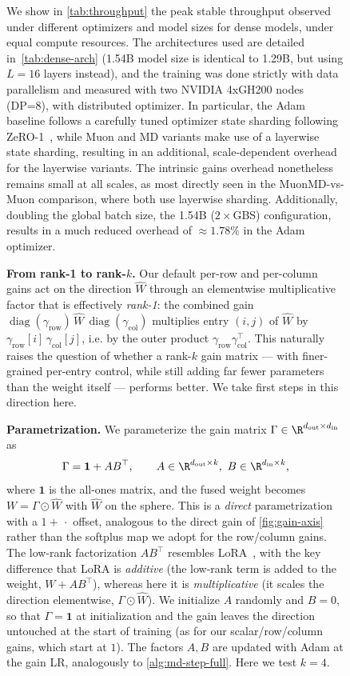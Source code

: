 \documentclass[10pt]{article} %
\makeatletter
\newcommand{\What}{\widehat{W}}              %
\newcommand{\grow}{\gamma_{\text{row}}}      %
\newcommand{\gcol}{\gamma_{\text{col}}}      %
\newcommand{\dout}{d_{\text{out}}}
\newcommand{\din}{d_{\text{in}}}
\DeclareMathOperator{\diag}{diag}
\def\section{\@startsection{section}{1}{\z@}{-2.0ex plus -0.5ex minus -.2ex}{1.0ex plus 0.2ex minus 0.1ex}{\large\bf\raggedright\sffamily}}
\makeatother
\begin{document}
\begin{figure}[t]
We show in \autoref{tab:throughput} the peak stable throughput observed under different optimizers and model sizes for dense models, under equal compute resources.
The architectures used are detailed in~\autoref{tab:dense-arch} (1.54B model size is identical to 1.29B, but using $L=16$ layers instead), and the training was done strictly with data parallelism and measured with two NVIDIA 4xGH200 nodes (DP=8), with distributed optimizer.
In particular, the Adam baseline follows a carefully tuned optimizer state sharding following ZeRO-1~\citep{rajbhandari2020zeromemoryoptimizationstraining}, while Muon and MD variants make use of a layerwise state sharding, resulting in an additional, scale-dependent overhead for the layerwise variants.
The intrinsic gains overhead nonetheless remains small at all scales, as most directly seen in the MuonMD-vs-Muon comparison, where both use layerwise sharding.
Additionally, doubling the global batch size, the 1.54B ($2\times$GBS) configuration, results in a much reduced overhead of $\approx 1.78\%$ in the Adam optimizer.

\section{Higher-Rank Gains}
\label{sec:appendix-higherrank}

\textbf{From rank-1 to rank-$k$.} Our default per-row and per-column gains act on the direction $\What$ through an elementwise multiplicative factor that is effectively \emph{rank-1}: the combined gain $\diag(\grow)\,\What\,\diag(\gcol)$ multiplies entry $(i,j)$ of $\What$ by $\grow[i]\,\gcol[j]$, i.e. by the outer product $\grow\gcol^\top$. This naturally raises the question of whether a rank-$k$ gain matrix --- with finer-grained per-entry control, while still adding far fewer parameters than the weight itself --- performs better. We take first steps in this direction here.

\textbf{Parametrization.} We parameterize the gain matrix $\Gamma\in\R^{\dout\times\din}$ as
\begin{equation}
\Gamma = \mathbf{1} + A B^\top, \qquad A\in\R^{\dout\times k},\ B\in\R^{\din\times k},
\label{eq:higherrank-gain}
\end{equation}
where $\mathbf{1}$ is the all-ones matrix, and the fused weight becomes $W = \Gamma \odot \What$ with $\What$ on the sphere. This is a \emph{direct} parametrization with a $1+\,\cdot$ offset, analogous to the direct gain of \autoref{fig:gain-axis} rather than the softplus map we adopt for the row/column gains. The low-rank factorization $AB^\top$ resembles LoRA~\citep{hu2022lora}, with the key difference that LoRA is \emph{additive} (the low-rank term is added to the weight, $W+AB^\top$), whereas here it is \emph{multiplicative} (it scales the direction elementwise, $\Gamma\odot\What$). We initialize $A$ randomly and $B=0$, so that $\Gamma=\mathbf{1}$ at initialization and the gain leaves the direction untouched at the start of training (as for our scalar/row/column gains, which start at $1$). The factors $A,B$ are updated with Adam at the gain LR, analogously to \autoref{alg:md-step-full}. Here we test $k=4$.


\end{figure}
\end{document}
